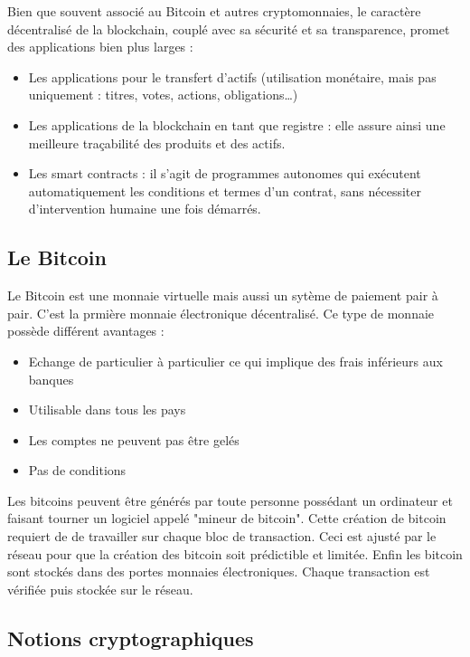 \documentclass{article}
\begin{document}
Bien que souvent associé au Bitcoin et autres cryptomonnaies, le caractère décentralisé de la blockchain, couplé avec sa sécurité et sa transparence, promet des applications bien plus larges : 
\begin{itemize}
    \item Les applications pour le transfert d’actifs (utilisation monétaire, mais pas uniquement : titres, votes, actions, obligations…)
    \item Les applications de la blockchain en tant que registre : elle assure ainsi une meilleure traçabilité des produits et des actifs.
    \item Les smart contracts : il s’agit de programmes autonomes qui exécutent automatiquement les conditions et termes d’un contrat, sans nécessiter d’intervention humaine une fois démarrés. 
\end{itemize} 

\newpage

\subsection{Le Bitcoin}

Le Bitcoin est une monnaie virtuelle mais aussi un sytème de paiement pair à pair. C'est la prmière monnaie électronique décentralisé. Ce type de monnaie possède différent avantages : 
\begin{itemize}
    \item Echange de particulier à particulier ce qui implique des frais inférieurs aux banques
    \item Utilisable dans tous les pays
    \item Les comptes ne peuvent pas être gelés
    \item Pas de conditions
\end{itemize}

Les bitcoins peuvent être générés par toute personne possédant un ordinateur et faisant tourner un logiciel appelé "mineur de bitcoin". Cette création de bitcoin requiert de de travailler sur chaque bloc de transaction. Ceci est ajusté par le réseau pour que la création des bitcoin soit prédictible et limitée. Enfin les bitcoin sont stockés dans des portes monnaies électroniques. Chaque transaction est vérifiée puis stockée sur le réseau.

\subsection{Notions cryptographiques}
\end{document}
